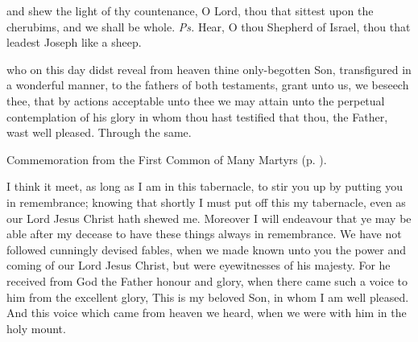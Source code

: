 \clearpage
{}

\introit
{} and shew the light of thy countenance, O Lord, thou that sittest upon the cherubims, and we shall be whole. \textit{Ps.} Hear, O thou Shepherd of Israel, thou that leadest Joseph like a sheep.

\collect
{} who on this day didst reveal from heaven thine only-begotten Son, transfigured in a wonderful manner, to the fathers of both testaments, grant unto us, we beseech thee, that by actions acceptable unto thee we may attain unto the perpetual contemplation of his glory in whom thou hast testified that thou, the Father, wast well pleased. Through the same.

\begin{rubric}
	 Commemoration  from the First Common of Many Martyrs (p. \pageref{CommonMartyrsICollect}).
\end{rubric}

 I think it meet, as long as I am in this tabernacle, to stir you up by putting you in remembrance; knowing that shortly I must put off this my tabernacle, even as our Lord Jesus Christ hath shewed me. Moreover I will endeavour that ye may be able after my decease to have these things always in remembrance. We have not followed cunningly devised fables, when we made known unto you the power and coming of our Lord Jesus Christ, but were eyewitnesses of his majesty. For he received from God the Father honour and glory, when there came such a voice to him from the excellent glory, This is my beloved Son, in whom I am well pleased. And this voice which came from heaven we heard, when we were with him in the holy mount.



\vspace{-0.2\baselineskip}

